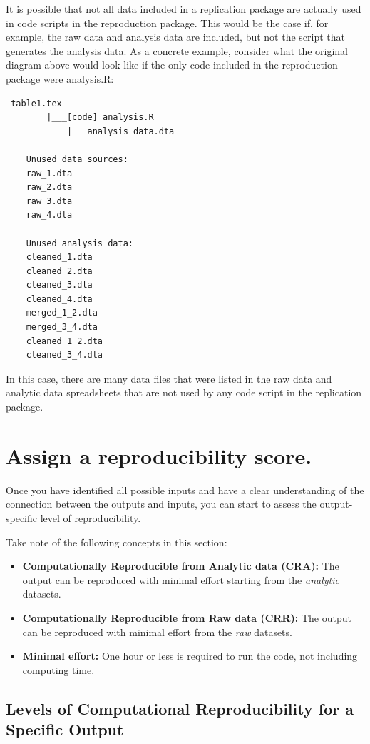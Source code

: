 \documentclass[]{book}
\begin{document}
It is possible that not all data included in a replication package are actually used in code scripts in the reproduction package. This would be the case if, for example, the raw data and analysis data are included, but not the script that generates the analysis data. As a concrete example, consider what the original diagram above would look like if the only code included in the reproduction package were analysis.R:

\begin{verbatim}
 table1.tex
        |___[code] analysis.R
            |___analysis_data.dta

    Unused data sources:
    raw_1.dta
    raw_2.dta
    raw_3.dta
    raw_4.dta

    Unused analysis data:
    cleaned_1.dta
    cleaned_2.dta
    cleaned_3.dta
    cleaned_4.dta
    merged_1_2.dta
    merged_3_4.dta
    cleaned_1_2.dta
    cleaned_3_4.dta
\end{verbatim}

In this case, there are many data files that were listed in the raw data and analytic data spreadsheets that are not used by any code script in the replication package.

\hypertarget{score}{%
\section{Assign a reproducibility score.}\label{score}}

Once you have identified all possible inputs and have a clear understanding of the connection between the outputs and inputs, you can start to assess the output-specific level of reproducibility.

Take note of the following concepts in this section:

\begin{itemize}
\item
  \textbf{Computationally Reproducible from Analytic data (CRA):} The output can be reproduced with minimal effort starting from the \emph{analytic} datasets.
\item
  \textbf{Computationally Reproducible from Raw data (CRR):} The output can be reproduced with minimal effort from the \emph{raw} datasets.
\item
  \textbf{Minimal effort:} One hour or less is required to run the code, not including computing time.
\end{itemize}

\hypertarget{levels-of-computational-reproducibility-for-a-specific-output}{%
\subsection{Levels of Computational Reproducibility for a Specific Output}\label{levels-of-computational-reproducibility-for-a-specific-output}}
\end{document}

